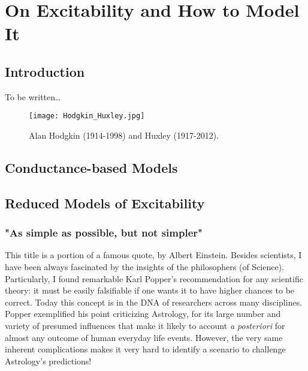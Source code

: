 \chapter{On Excitability and How to Model It}
\label{excitab} %



\section{Introduction}\label{sec:1}
To be written\dots


\begin{figure}[t]
	\sidecaption[t]
	\centering
	\texttt{[image: Hodgkin\_Huxley.jpg]}
	\caption{Alan Hodgkin (1914-1998) and Huxley (1917-2012).}
	\label{fig:HodgkinHuxley}       %
	\end{figure}


\section{Conductance-based Models}\label{sec:2}


\section{Reduced Models of Excitability}\label{sec:3}

\subsection{"As simple as possible, but not simpler"}
This title is a portion of a famous quote, by Albert Einstein. Besides scientists, I have been always fascinated by the insights of the philosophers (of Science). Particularly, I found remarkable Karl Popper's recommendation for any scientific theory: it must be easily falsifiable if one wants it to have higher chances to be correct. Today this concept is in the DNA of researchers across many disciplines. Popper exemplified his point criticizing Astrology, for its large number and variety of presumed  influences that make it likely to account \textit{a posteriori} for almost any outcome of human everyday life events. However, the very same inherent complications makes it very hard to identify a scenario to challenge Astrology's predictions! 

